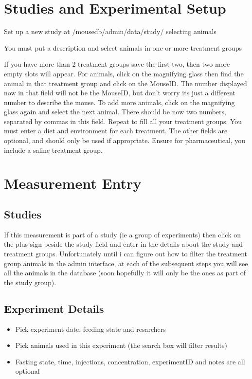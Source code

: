 \documentclass[letterpaper,10pt,english]{sphinxmanual}
\begin{document}
\chapter{Studies and Experimental Setup}
\label{usage:studies-and-experimental-setup}
Set up a new study at /mousedb/admin/data/study/ selecting animals

You must put a description and select animals in one or more treatment groups

If you have more than 2 treatment groups save the first two, then two more empty slots will appear. For animals, click on the magnifying glass then find the animal in that treatment group and click on the MouseID. The number displayed now in that field will not be the MouseID, but don't worry its just a different number to describe the mouse. To add more animals, click on the magnifying glass again and select the next animal. There should be now two numbers, separated by commas in this field. Repeat to fill all your treatment groups. You must enter a diet and environment for each treatment. The other fields are optional, and should only be used if appropriate. Ensure for pharmaceutical, you include a saline treatment group.


\chapter{Measurement Entry}
\label{usage:measurement-entry}

\section{Studies}
\label{usage:studies}
If this measurement is part of a study (ie a group of experiments) then click on the plus sign beside the study field and enter in the details about the study and treatment groups.  Unfortunately until i can figure out how to filter the treatment group animals in the admin interface, at each of the subsequent steps you will see all the animals in the database (soon hopefully it will only be the ones as part of the study group).


\section{Experiment Details}
\label{usage:experiment-details}\begin{itemize}
\item {} 
Pick experiment date, feeding state and resarchers

\item {} 
Pick animals used in this experiment (the search box will filter results)

\item {} 
Fasting state, time, injections, concentration, experimentID and notes are all optional

\end{itemize}
\end{document}
